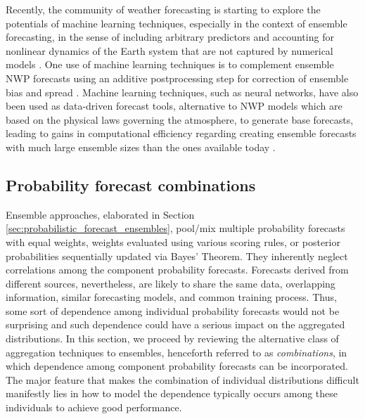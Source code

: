 \documentclass[11pt]{article}
\begin{document}
Recently, the community of weather forecasting is starting to explore the potentials of machine learning techniques, especially in the context of ensemble forecasting, in the sense of including arbitrary predictors and accounting for nonlinear dynamics of the Earth system that are not captured by numerical models \citep{Dueben2021-fe}. One use of machine learning techniques is to complement ensemble NWP \citep[numerical weather prediction, see, e.g.,][for a summary of its revolution]{Bauer2015-dg,Benjamin2019-zp} forecasts using an additive postprocessing step for correction of ensemble bias and spread \citep{Rasp2018-zu,Scher2018-dm,Gronquist2021-no}. Machine learning techniques, such as neural networks, have also been used as data-driven forecast tools, alternative to NWP models which are based on the physical laws governing the atmosphere, to generate base forecasts, leading to gains in computational efficiency regarding creating ensemble forecasts with much large ensemble sizes than the ones available today \citep{Dueben2018-ln,Scher2018-of,Rasp2021-az,Scher2021-ee}.

\subsection{Probability forecast combinations}
\label{sec:probability_forecast_combinations}


Ensemble approaches, elaborated in Section \ref{sec:probabilistic_forecast_ensembles}, pool/mix multiple probability forecasts with equal weights, weights evaluated using various scoring rules, or posterior probabilities sequentially updated via Bayes' Theorem. They inherently neglect correlations among the component probability forecasts. Forecasts derived from different sources, nevertheless, are likely to share the same data, overlapping information, similar forecasting models, and common training process. Thus, some sort of dependence among individual probability forecasts would not be surprising and such dependence could have a serious impact on the aggregated distributions. In this section, we proceed by reviewing the alternative class of aggregation techniques to ensembles, henceforth referred to as \textit{combinations}, in which dependence among component probability forecasts can be incorporated. The major feature that makes the combination of individual distributions difficult manifestly lies in how to model the dependence typically occurs among these individuals to achieve good performance.
\end{document}
